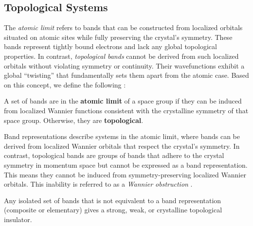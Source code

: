 \subsection{Topological Systems}

The \textit{atomic limit} refers to bands that can be constructed from localized orbitals situated on atomic sites while fully preserving the crystal's symmetry. These bands represent tightly bound electrons and lack any global topological properties. In contrast, \textit{topological bands} cannot be derived from such localized orbitals without violating symmetry or continuity. Their wavefunctions exhibit a global ``twisting'' that fundamentally sets them apart from the atomic case. Based on this concept, we define the following \cite{building_blocks2018}:

\begin{definition}
A set of bands are in the \textbf{atomic limit} of a space group if they can be induced from localized Wannier functions consistent with the crystalline symmetry of that space group. Otherwise, they are \textbf{topological}.
\end{definition}

Band representations describe systems in the atomic limit, where bands can be derived from localized Wannier orbitals that respect the crystal's symmetry. In contrast, topological bands are groups of bands that adhere to the crystal symmetry in momentum space but cannot be expressed as a band representation. This means they cannot be induced from symmetry-preserving localized Wannier orbitals. This inability is referred to as a \textit{Wannier obstruction} \cite{FragileTopology_Po2018, building_blocks2018}.

\begin{theorem} \label{th:topo_insul}
Any isolated set of bands that is not equivalent to a band representation (composite or elementary) gives a strong, weak, or crystalline topological insulator.
\end{theorem}



